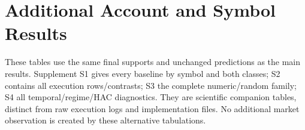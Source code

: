 \section{Additional Account and Symbol Results}
\label{app:additional}
These tables use the same final supports and unchanged predictions as the main results. Supplement S1 gives every baseline by symbol and both classes; S2 contains all execution rows/contrasts; S3 the complete numeric/random family; S4 all temporal/regime/HAC diagnostics. They are scientific companion tables, distinct from raw execution logs and implementation files. No additional market observation is created by these alternative tabulations.
\begingroup
\let\savedappendixtable\table
\def\table[#1]{\savedappendixtable[H]}


\endgroup
\FloatBarrier
